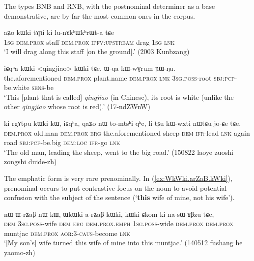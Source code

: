 The types BNB and RNB, with the postnominal determiner as a base demonstrative, are by far the most common ones in the corpus.

\begin{exe}
\ex \label{ex:kWki.tAYi.ki}
 \gll  aʑo kɯki tɤɲi ki lu-nɤkʰɯkʰrɯt-a tɕe \\
 \textsc{1sg} \textsc{dem}.\textsc{prox} staff \textsc{dem}.\textsc{prox} \textsc{ipfv}:\textsc{upstream}-drag-\textsc{1sg} \textsc{lnk} \\
 \glt `I will drag along this staff [on the ground].' (2003 Kunbzang)
\end{exe}
 

\begin{exe}
\ex \label{ex:kWki.qingjiao.kWki}
 \gll iɕqʰa kɯki <qingjiao> kɯki tɕe, ɯ-qa kɯ-wɣrum ɲɯ-ŋu. \\
 the.aforementioned \textsc{dem}.\textsc{prox} plant.name \textsc{dem}.\textsc{prox} \textsc{lnk} \textsc{3sg}.\textsc{poss}-root \textsc{sbj}:\textsc{pcp}-be.white \textsc{sens}-be \\
 \glt `This [plant that is called]  \textit{qingjiao} (in Chinese), its root is white (unlike the other \textit{qingjiao} whose root is red).' (17-ndZWnW) 
\end{exe}

\begin{exe}
\ex \label{ex:ki.rgAtpu.kWki}
 \gll ki rgɤtpu kɯki kɯ, iɕqʰa, qaʑo nɯ to-mtsʰi qʰe, li tʂu kɯ-wxti nɯtɕu jo-ɕe tɕe, \\
\textsc{dem}.\textsc{prox} old.man \textsc{dem}.\textsc{prox} \textsc{erg} the.aforementioned sheep \textsc{dem} \textsc{ifr}-lead \textsc{lnk} again road \textsc{sbj}:\textsc{pcp}-be.big \textsc{dem}:\textsc{loc} \textsc{ifr}-go \textsc{lnk} \\
\glt `The old man, leading the sheep, went to the big road.' (150822 laoye zuoshi zongshi duide-zh)
\end{exe}

The emphatic form is very rare prenominally. In (\ref{ex:WkWki.arZaB.kWki}), prenominal  occurs to put contrastive focus on the noun to avoid potential confusion with the subject of the sentence (`\textbf{this} wife of mine, not his wife').

\begin{exe}
\ex \label{ex:WkWki.arZaB.kWki}
 \gll   nɯ ɯ-rʑaβ nɯ kɯ, ɯkɯki a-rʑaβ kɯki, kɯki ɕkom ki na-sɯ-ɤβzu tɕe, \\
 \textsc{dem} \textsc{3sg}.\textsc{poss}-wife \textsc{dem} \textsc{erg} \textsc{dem}.\textsc{prox}.\textsc{emph} \textsc{1sg}.\textsc{poss}-wide \textsc{dem}.\textsc{prox} \textsc{dem}.\textsc{prox} muntjac \textsc{dem}.\textsc{prox}  \textsc{aor}:3\flobv{}-\textsc{caus}-become \textsc{lnk} \\
\glt `[My son's] wife turned this wife of mine into this muntjac.' (140512 fushang he yaomo-zh)
\end{exe}

